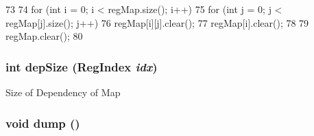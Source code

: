 \begin{DoxyCode}
73 {
74     for (int i = 0; i < regMap.size(); i++) {
75         for (int j = 0; j < regMap[j].size(); j++)
76             regMap[i][j].clear();
77         regMap[i].clear();
78     }
79     regMap.clear();
80 }
\end{DoxyCode}
\hypertarget{classRegDepMap_ab532dbca982a8cc2a418fdc6e36d3d87}{
\subsubsection[{depSize}]{\setlength{\rightskip}{0pt plus 5cm}int depSize ({\bf RegIndex} {\em idx})}}
\label{classRegDepMap_ab532dbca982a8cc2a418fdc6e36d3d87}
Size of Dependency of Map \hypertarget{classRegDepMap_accd2600060dbaee3a3b41aed4034c63c}{
\subsubsection[{dump}]{\setlength{\rightskip}{0pt plus 5cm}void dump ()}}
\label{classRegDepMap_accd2600060dbaee3a3b41aed4034c63c}



